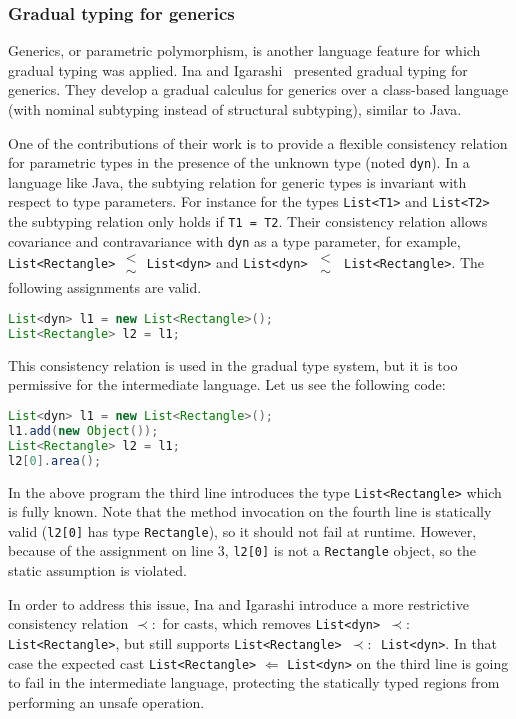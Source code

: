 \documentclass{article}
\newcommand\csub[0]{\substack{<\\\sim}}
\newcommand\rcsub[0]{$\prec:$}
\newcommand\icode[1]{\texttt{#1}}
\begin{document}
\subsubsection{Gradual typing for generics}
Generics, or parametric polymorphism, is another language feature for which gradual typing was applied. Ina and Igarashi~\cite{ina:oopsla2011} presented gradual typing for generics. They develop a gradual calculus for generics over a class-based language (with nominal subtyping instead of structural subtyping), similar to Java.  

One of the contributions of their work is to provide a flexible consistency relation for parametric types in the presence of the unknown type (noted \icode{dyn}). In a language like Java, the subtying relation for generic types is invariant with respect to type parameters. For instance for the types \icode{List<T1>} and \icode{List<T2>} the subtyping relation only holds if \icode{T1 = T2}.  Their consistency relation allows covariance and contravariance with \icode{dyn} as a type parameter, for example, \icode{List<Rectangle>} $\csub$  \icode{List<dyn>} and \icode{List<dyn> $\csub$ List<Rectangle>}. The following assignments are valid.
\begin{lstlisting}[language=Java]
List<dyn> l1 = new List<Rectangle>();
List<Rectangle> l2 = l1;
\end{lstlisting}

This consistency relation is used in the gradual type system, but it is too permissive for the intermediate language. Let us see the following code:
\begin{lstlisting}[language=Java]
List<dyn> l1 = new List<Rectangle>();
l1.add(new Object());
List<Rectangle> l2 = l1;
l2[0].area();
\end{lstlisting}
In the above program the third line introduces the type \icode{List<Rectangle>} which is fully known. Note that the method invocation on the fourth line is statically valid (\icode{l2[0]} has type \icode{Rectangle}), so it should not fail at runtime. However, because of the assignment on line 3, \icode{l2[0]} is not a \icode{Rectangle} object, so the static assumption is violated.
    
In order to address this issue, Ina and Igarashi introduce a more restrictive consistency relation \rcsub \: for casts, which removes \icode{List<dyn> \rcsub \: List<Rectangle>}, but still supports \icode{List<Rectangle> \rcsub \: List<dyn>}. In that case the expected cast \icode{List<Rectangle>} $\Leftarrow$ \icode{List<dyn>} on the third line is going to fail in the intermediate language, protecting the statically typed regions from performing an unsafe operation.
\end{document}
